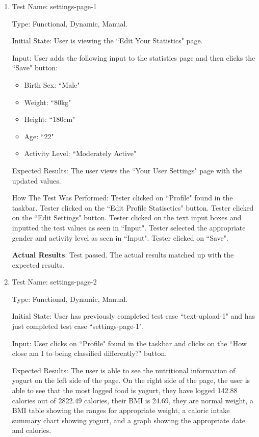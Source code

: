 \documentclass[12pt, titlepage]{article}
\begin{document}
	\begin{enumerate}
		\item{Test Name: settings-page-1}
		
		Type: Functional, Dynamic, Manual.
		
		Initial State: User is viewing the ``Edit Your Statistics" page.
		
		Input: User adds the following input to the statistics page and then clicks the ``Save" button:
		
	\begin{itemize}
		\item Birth Sex: ``Male"
		\item Weight: ``80kg"
		\item Height: ``180cm"
		\item Age: ``22"
		\item Activity Level: ``Moderately Active"
	\end{itemize}
		
		Expected Results: The user views the ``Your User Settings" page with the updated values.
		
		How The Test Was Performed: Tester clicked on ``Profile" found in the taskbar. Tester clicked on the ``Edit Profile Statisctics" button. Tester clicked on the ``Edit Settings" button. Tester clicked on the text input boxes and inputted the test values as seen in ``Input". Tester selected the appropriate gender and activity level as seen in ``Input". Tester clicked on ``Save".
		
		\textbf{Actual Results}: Test passed. The actual results matched up with the expected results.
		
		\item{Test Name: settings-page-2}
		
		Type: Functional, Dynamic, Manual.
		
		Initial State: User has previously completed test case ``text-upload-1" and has just completed test case ``settings-page-1".
		
		Input: User clicks on ``Profile" found in the taskbar and clicks on the ``How close am I to being classified differently?" button.
		
		Expected Results: The user is able to see the nutritional information of yogurt on the left side of the page. On the right side of the page, the user is able to see that the most logged food is yogurt, they have logged 142.88 calories out of 2822.49 calories, their BMI is 24.69, they are normal weight, a BMI table showing the ranges for appropriate weight, a caloric intake summary chart showing yogurt, and a graph showing the appropriate date and calories.
		

\end{enumerate}
\end{document}
